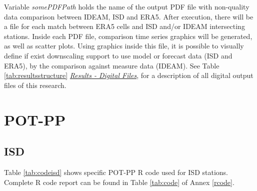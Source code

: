 \documentclass[12pt,twoside]{reedthesis}
\begin{document}
Variable \emph{somePDFPath} holds the name of the output PDF file with non-quality data comparison between IDEAM, ISD and ERA5. After execution, there will be a file for each match between ERA5 cells and ISD and/or IDEAM intersecting stations. Inside each PDF file, comparison time series graphics will be generated, as well as scatter plots. Using graphics inside this file, it is possible to visually define if exist downscaling support to use model or forecast data (ISD and ERA5), by the comparison against measure data (IDEAM). See Table \ref{tab:resultsstructure} \emph{\protect\hyperlink{results}{Results - Digital Files}}, for a description of all digital output files of this research.

\hypertarget{pot-pp-1}{%
\section{POT-PP}\label{pot-pp-1}}

\hypertarget{isd-1}{%
\subsection{ISD}\label{isd-1}}

Table \ref{tab:codeisd} shows specific POT-PP R code used for ISD stations. Complete R code report can be found in Table \ref{tab:code} of Annex \ref{rcode}.
\end{document}
